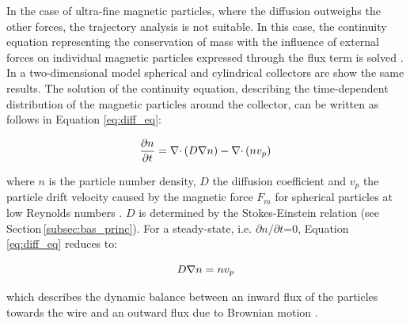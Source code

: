 In the case of ultra-fine magnetic particles, where the diffusion outweighs the other forces, the trajectory analysis is not suitable. In this case, the continuity equation representing the conservation of mass with the influence of external forces on individual magnetic particles expressed through the flux term is solved \cite{choomphon2017simulation}. In a two-dimensional model spherical and cylindrical collectors are show the same results. The solution of the continuity equation, describing the time-dependent distribution of the magnetic particles around the collector, can be written as follows in Equation \ref{eq:diff_eq}:     

\begin{equation}
\label{eq:diff_eq}
\centering
\frac{\partial n}{\partial t} = \nabla\cdotp(D\nabla n)-\nabla\cdotp(n v_{p})
\end{equation}

where $n$ is the particle number density, $D$ the diffusion coefficient and $v_{p}$ the particle drift velocity caused by the magnetic force $F_{m}$ for spherical particles at low Reynolds numbers \cite{fletcher1991fine,FranzrebHabil}. $D$ is determined by the Stokes-Einstein relation (see Section\,\ref{subsec:bas_princ}). For a steady-state, i.e. ${\partial n}/{\partial t}$=0, Equation\,\ref{eq:diff_eq} reduces to:

\begin{equation}
\label{eq:diff_eq_2}
\centering
 D\nabla n = n v_{p}
\end{equation}

which describes the dynamic balance between an inward flux of the particles towards the wire and an outward flux due to Brownian motion \cite{fletcher1991fine}. 



% 


